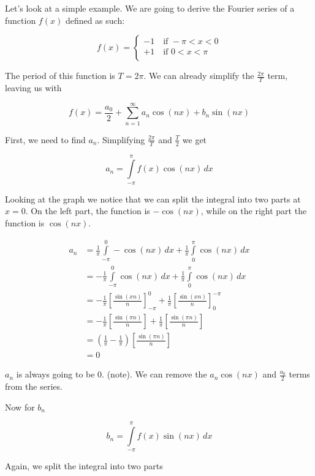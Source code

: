 \documentclass[a4paper]{article}
\newcommand{\integral}[4]{\int\limits_{#1}^{#2} #3\,d#4}
\begin{document}
Let's look at a simple example. We are going to derive the Fourier series of a function \(f(x)\) defined as such:

\[
    f(x)=
    \begin{cases}
        -1\quad \text{if } -\pi < x < 0 \\
        +1\quad \text{if } 0 < x < \pi \\
    \end{cases}
\]

The period of this function is \(T=2\pi\). We can already simplify the \(\frac{2\pi}{T}\) term, leaving us with

\[
    f(x)=\frac{a_0}{2} + \sum_{n=1}^{\infty} a_n \cos(nx) + b_n \sin(nx)
\]

First, we need to find \(a_n\). Simplifying \(\frac{2\pi}{T}\) and \(\frac{T}{2}\) we get

\[
    a_n=\integral{-\pi}{\pi}{f(x)\cos(nx)}{x}
\]

Looking at the graph we notice that we can split the integral into two parts at \(x=0\).
On the left part, the function is \(-\cos(nx)\), while on the right part the function is \(\cos(nx)\).

\begin{align*}
    a_n &=
    \frac{1}{\pi} \integral{-\pi}{0}{-\cos(nx)}{x} +
    \frac{1}{\pi} \integral{0}{\pi}{\cos(nx)}{x} \\
    &= -\frac{1}{\pi} \integral{-\pi}{0}{\cos(nx)}{x} +
    \frac{1}{\pi} \integral{0}{\pi}{\cos(nx)}{x} \\
    &= -\frac{1}{\pi} {\left[\frac{\sin(xn)}{n}\right]}_{-\pi}^{0} +
    \frac{1}{\pi} {\left[\frac{\sin(xn)}{n}\right]}_{0}^{-\pi} \\
    &= -\frac{1}{\pi} \left[\frac{\sin(\pi n)}{n}\right] +
    \frac{1}{\pi} \left[\frac{\sin(\pi n)}{n}\right] \\
    &= \left(\frac{1}{\pi}-\frac{1}{\pi}\right) \left[\frac{\sin(\pi n)}{n}\right] \\
    &= 0
\end{align*}

\(a_n\) is always going to be 0. (note). We can remove the \(a_n \cos(nx)\) and \(\frac{a_0}{2}\) terms from the series.

Now for \(b_n\)

\[
    b_n=\integral{-\pi}{\pi}{f(x)\sin(nx)}{x}
\]

Again, we split the integral into two parts
\end{document}
